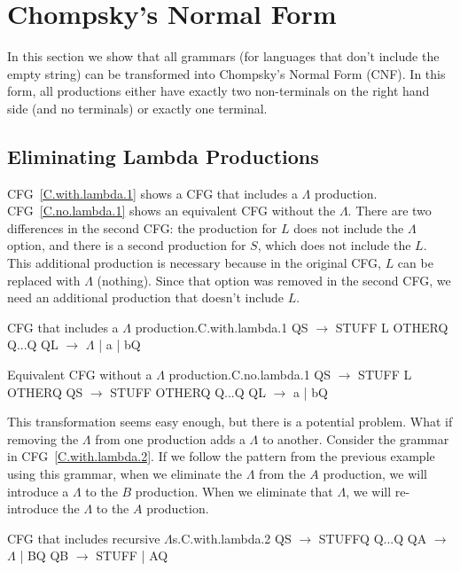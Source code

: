 \documentclass[letterpaper,12pt,openany,reqno]{book}%
\newcommand{\cfgprod}[2] {{\ttfamily #1} $\rightarrow$ {\ttfamily #2}}
\begin{document}
\section{Chompsky's Normal Form}
In this section we show that all grammars (for languages that don't include the empty string) can be transformed into Chompsky's Normal Form (CNF). In this form, all productions either have exactly two non-terminals on the right hand side (and no terminals) or exactly one terminal.

\subsection {Eliminating Lambda Productions}
CFG~\ref{C.with.lambda.1} shows a CFG that includes a $\Lambda$ production. CFG~\ref{C.no.lambda.1} shows an equivalent CFG without the $\Lambda$. There are two differences in the second CFG: the production for $L$ does not include the $\Lambda$ option, and there is a second production for $S$, which does not include the $L$. This additional production is necessary because in the original CFG, $L$ can be replaced with $\Lambda$ (nothing). Since that option was removed in the second CFG, we need an additional production that doesn't include $L$.
\begin{cfg}{CFG that includes a $\Lambda$ production.}{C.with.lambda.1}
Q\cfgprod{S}{STUFF L OTHER}Q
Q...Q
Q\cfgprod{L}{$\Lambda$ | a | b}Q
\end{cfg}
\begin{cfg}{Equivalent CFG without a $\Lambda$ production.}{C.no.lambda.1}
Q\cfgprod{S}{STUFF L OTHER}Q
Q\cfgprod{S}{STUFF OTHER}Q
Q...Q
Q\cfgprod{L}{a | b}Q
\end{cfg}

This transformation seems easy enough, but there is a potential problem. What if removing the $\Lambda$ from one production adds a $\Lambda$ to another. Consider the grammar in CFG~\ref{C.with.lambda.2}. If we follow the pattern from the previous example using this grammar, when we eliminate the $\Lambda$ from the $A$ production, we will introduce a $\Lambda$ to the $B$ production. When we eliminate that $\Lambda$, we will re-introduce the $\Lambda$ to the $A$ production.
\begin{cfg}{CFG that includes recursive $\Lambda$s.}{C.with.lambda.2}
Q\cfgprod{S}{STUFF}Q
Q...Q
Q\cfgprod{A}{$\Lambda$ | B}Q
Q\cfgprod{B}{STUFF | A}Q
\end{cfg}
\end{document}
